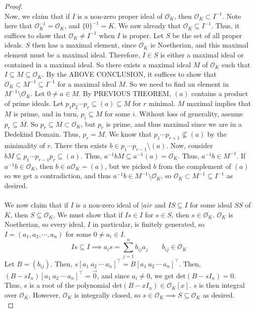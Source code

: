 \documentclass{article}
\newcommand{\air}{\mathcal{O}_K}
\begin{document}
\begin{proof}
\\
Now, we claim that if $I$ is a non-zero proper ideal of $\air$, then $\air\subset I^{-1}$. Note here that $\air^{-1}=\air$, and $\{0\}^{-1}=K$. We saw already that $\air\subseteq I^{-1}$. Thus, it suffices to show that $\air\neq I^{-1}$ when $I$ is proper. Let $S$ be the set of all proper ideals. $S$ then has a maximal element, since $\air$ ie Noetherian, and this maximal element must be a maximal ideal. Therefore, $I\in S$ is either a maximal ideal or contained in a maximal ideal. So there exists a maximal ideal $M$ of $\air$ such that $I\subseteq M\subseteq\air$. By the ABOVE CONCLUSION, it suffices to show that $\air\subset M^{-1}\subseteq I^{-1}$ for a maximal ideal $M$. So we need to find an element in $M^{-1}\setminus \air$. Let $0\neq a\in M$. By PREVIOUS THEOREM, $(a)$ contains a product of prime ideals. Let $p_1p_2\cdots p_r\subseteq (a)\subseteq M$ for $r$ minimal. $M$ maximal implies that $M$ is prime, and in turn, $p_i\subseteq M$ for some $i$. Without loss of generality, assume $p_r\subseteq M$. So $p_r\subseteq M\subset \air$, but $p_r$ is prime, and thus maximal since we are in a Dedekind Domain. Thus, $p_r=M$. We know that $p_1\cdots p_{r+1}\not\subseteq (a)$ by the minimality of $r$. There then exists $b\in p_1\cdots p_{r-1}\setminus (a)$. Now, consider $bM\subseteq p_1\cdots p_{r-1}p_r\subseteq (a)$. Thus, $a^{-1}bM\subseteq a^{-1}(a)=\air$. Thus, $a^{-1}b\in M^{-1}$. If $a^{-1}b\in\air$, then $b\in a\air = (a)$, but we picked $b$ from the complement of $(a)$ so we get a contradiction, and thus $a^{-1}b\in M^{-1}\setminus\air$, so $\air\subset M^{-1}\subseteq I^{-1}$ as desired.\\
\\
We now claim that if $I$ is a non-zero ideal of $|air$ and $IS\subseteq I$ for some ideal $SS$ of $K$, then $S\subseteq \air$. We must show that if $Is\in I$ for $s\in S$, then $s\in\air$. $\air$ is Noetherian, so every ideal, $I$ in particular, is finitely generated, so $I=(a_1,a_2,\cdots, a_n)$ for some $0\neq a_i\in I$. 
$$Is\subseteq I\implies a_is=\displaystyle\sum_{j=1}^n b_{ij}a_j\qquad b_{ij}\in\air$$
Let $B=(b_{ij})$. Then, $s[a_1\ a_2\ \cdots\ a_n]^\top = B[a_1\ a_2\ \cdots\ a_n]^\top$. Then, $(B-sI_n)[a_1\ a_2\ \cdots\ a_n]^\top = \vec{0}$, and since $a_i\neq 0$, we get $\text{det}(B-sI_n)=0$. Thus, $s$ is a root of the polynomial $\text{det}(B-xI_n)\in\air [x]$. $s$ is then integral over $\air$. However, $\air$ is integrally closed, so $s\in \air\implies S\subseteq \air$ as desired.\\

\end{proof}
\end{document}
